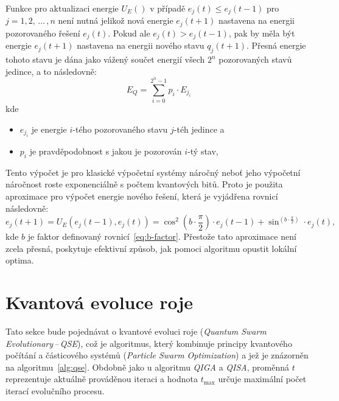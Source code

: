 Funkce pro aktualizaci energie $U_E\left(\right)$ v případě $e_j\left(t\right) \leq e_j\left(t-1\right)$ pro $j = 1,2,\,\dots\,,n$ není nutná jelikož nová energie $e_j\left(t+1\right)$ nastavena na energii pozorovaného řešení $e_j\left(t\right)$. 
Pokud ale $e_j\left(t\right) > e_j\left(t-1\right)$, pak by měla být energie $e_j\left(t+1\right)$ nastavena na energii nového stavu $q_j\left(t+1\right)$. 
Přesná energie tohoto stavu je dána jako vážený součet energií všech $2^n$ pozorovaných stavů jedince, a to následovně:
\begin{equation*}
    E_Q = \sum_{i=0}^{2^n-1} p_i \cdot E_{j_i}
\end{equation*}
kde 
\begin{itemize}
    \item $e_{j_i}$ je energie $i$-tého pozorovaného stavu $j$-téh jedince a
    \item $p_i$ je pravděpodobnost s jakou je pozorován $i$-tý stav,
\end{itemize}
Tento výpočet je pro klasické výpočetní systémy náročný neboť jeho výpočetní náročnost roste exponenciálně s počtem kvantových bitů. 
Proto je použita aproximace pro výpočet energie nového řešení, která je vyjádřena rovnicí následovně:
\begin{equation*}
    e_j\left(t+1\right) = U_E\left(e_j\left(t-1\right), e_j\left(t\right)\right) = \cos^2{\left(b \cdot \frac{\pi}{2}\right)} \cdot e_j\left(t-1\right) + \sin^{\left(b \cdot \frac{\pi}{2}\right)} \cdot e_j\left(t\right),
\end{equation*}
kde $b$ je faktor definovaný rovnicí~\ref{eq:b-factor}. Přestože tato aproximace není zcela přesná, poskytuje efektivní způsob, jak pomoci algoritmu opustit lokální optima. 

\section{Kvantová evoluce roje}
Tato sekce bude pojednávat o kvantové evoluci roje (\emph{Quantum Swarm Evolutionary\,--\,QSE}), což je algoritmus, který kombinuje principy kvantového počítání a částicového systémů (\emph{Particle Swarm Optimization}) a jež je znázorněn na algoritmu~\ref{alg:qse}. 
Obdobně jako u algoritmu \emph{QIGA} a \emph{QISA}, proměnná $t$ reprezentuje aktuálně prováděnou iteraci a hodnota $t_{\text{max}}$ určuje maximální počet iterací evolučního procesu.

